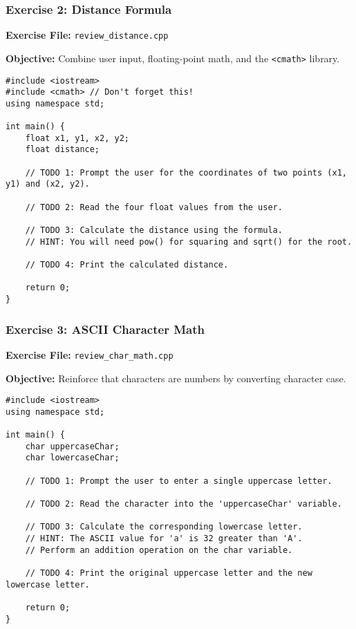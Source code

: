 \documentclass{beamer}
\begin{document}
\begin{frame}[fragile]
\frametitle{Exercise 2: Distance Formula}
\textbf{Exercise File:} \texttt{review_distance.cpp}\pause

\textbf{Objective:} Combine user input, floating-point math, and the \texttt{<cmath>} library.\pause

\begin{verbatim}
#include <iostream>
#include <cmath> // Don't forget this!
using namespace std;

int main() {
    float x1, y1, x2, y2;
    float distance;

    // TODO 1: Prompt the user for the coordinates of two points (x1, y1) and (x2, y2).
    
    // TODO 2: Read the four float values from the user.
    
    // TODO 3: Calculate the distance using the formula.
    // HINT: You will need pow() for squaring and sqrt() for the root.
    
    // TODO 4: Print the calculated distance.

    return 0;
}
\end{verbatim}
\end{frame}

\begin{frame}[fragile]
\frametitle{Exercise 3: ASCII Character Math}
\textbf{Exercise File:} \texttt{review_char_math.cpp}\pause

\textbf{Objective:} Reinforce that characters are numbers by converting character case.\pause

\begin{verbatim}
#include <iostream>
using namespace std;

int main() {
    char uppercaseChar;
    char lowercaseChar;

    // TODO 1: Prompt the user to enter a single uppercase letter.
    
    // TODO 2: Read the character into the 'uppercaseChar' variable.
    
    // TODO 3: Calculate the corresponding lowercase letter.
    // HINT: The ASCII value for 'a' is 32 greater than 'A'.
    // Perform an addition operation on the char variable.
    
    // TODO 4: Print the original uppercase letter and the new lowercase letter.

    return 0;
}
\end{verbatim}
\end{frame}
\end{document}
